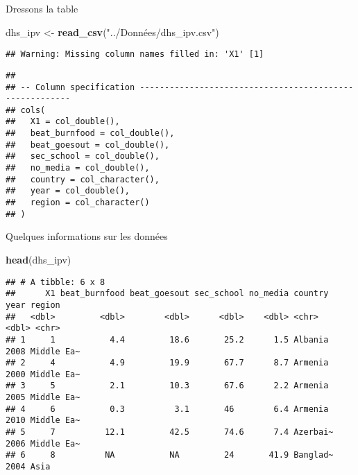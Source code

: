 \documentclass[ignorenonframetext,]{beamer}
\newenvironment{Shaded}{\begin{snugshade}}{\end{snugshade}}
\newcommand{\KeywordTok}[1]{\textcolor[rgb]{0.13,0.29,0.53}{\textbf{#1}}}
\newcommand{\StringTok}[1]{\textcolor[rgb]{0.31,0.60,0.02}{#1}}
\newcommand{\NormalTok}[1]{#1}
\begin{document}
\begin{frame}[fragile]{Dressons la table}
\begin{Shaded}
\begin{Highlighting}[]
\NormalTok{dhs_ipv <-}\StringTok{ }\KeywordTok{read_csv}\NormalTok{(}\StringTok{"../Données/dhs_ipv.csv"}\NormalTok{)}
\end{Highlighting}
\end{Shaded}

\begin{verbatim}
## Warning: Missing column names filled in: 'X1' [1]
\end{verbatim}

\begin{verbatim}
## 
## -- Column specification --------------------------------------------------------
## cols(
##   X1 = col_double(),
##   beat_burnfood = col_double(),
##   beat_goesout = col_double(),
##   sec_school = col_double(),
##   no_media = col_double(),
##   country = col_character(),
##   year = col_double(),
##   region = col_character()
## )
\end{verbatim}

\end{frame}

\begin{frame}[fragile]{Quelques informations sur les données}

\begin{Shaded}
\begin{Highlighting}[]
\KeywordTok{head}\NormalTok{(dhs_ipv)}
\end{Highlighting}
\end{Shaded}

\begin{verbatim}
## # A tibble: 6 x 8
##      X1 beat_burnfood beat_goesout sec_school no_media country   year region    
##   <dbl>         <dbl>        <dbl>      <dbl>    <dbl> <chr>    <dbl> <chr>     
## 1     1           4.4         18.6       25.2      1.5 Albania   2008 Middle Ea~
## 2     4           4.9         19.9       67.7      8.7 Armenia   2000 Middle Ea~
## 3     5           2.1         10.3       67.6      2.2 Armenia   2005 Middle Ea~
## 4     6           0.3          3.1       46        6.4 Armenia   2010 Middle Ea~
## 5     7          12.1         42.5       74.6      7.4 Azerbai~  2006 Middle Ea~
## 6     8          NA           NA         24       41.9 Banglad~  2004 Asia
\end{verbatim}

\end{frame}
\end{document}

